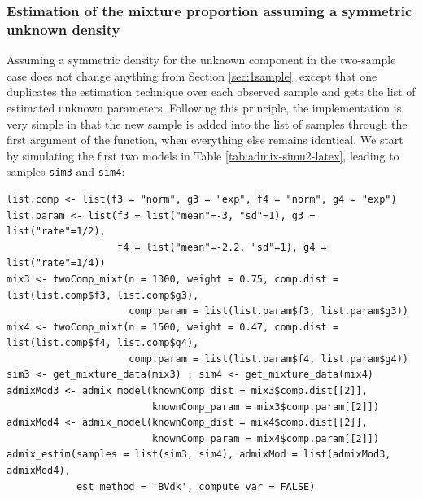 \begin{table}[!h]
\centering
\caption{\label{tab:admix-simu2-latex}Parameters in the two-sample case (K=2), with Gaussian and Exponential distributions.}
\centering
{}
\end{table}

\subsubsection{Estimation of the mixture proportion assuming a symmetric unknown density}\label{estimation-of-the-mixture-proportion-assuming-a-symmetric-unknown-density-1}

Assuming a symmetric density for the unknown component in the two-sample case does not change anything from Section \ref{sec:1sample}, except that one duplicates the estimation technique over each observed sample and gets the list of estimated unknown parameters. Following this principle, the implementation is very simple in that the new sample is added into the list of samples through the first argument of the function, when everything else remains identical.
We start by simulating the first two models in Table \ref{tab:admix-simu2-latex}, leading to samples \texttt{sim3} and \texttt{sim4}:

\begin{verbatim}
list.comp <- list(f3 = "norm", g3 = "exp", f4 = "norm", g4 = "exp")
list.param <- list(f3 = list("mean"=-3, "sd"=1), g3 = list("rate"=1/2),
                   f4 = list("mean"=-2.2, "sd"=1), g4 = list("rate"=1/4))
mix3 <- twoComp_mixt(n = 1300, weight = 0.75, comp.dist = list(list.comp$f3, list.comp$g3),
                     comp.param = list(list.param$f3, list.param$g3))
mix4 <- twoComp_mixt(n = 1500, weight = 0.47, comp.dist = list(list.comp$f4, list.comp$g4),
                     comp.param = list(list.param$f4, list.param$g4))
sim3 <- get_mixture_data(mix3) ; sim4 <- get_mixture_data(mix4)
admixMod3 <- admix_model(knownComp_dist = mix3$comp.dist[[2]],
                         knownComp_param = mix3$comp.param[[2]])
admixMod4 <- admix_model(knownComp_dist = mix4$comp.dist[[2]],
                         knownComp_param = mix4$comp.param[[2]])
admix_estim(samples = list(sim3, sim4), admixMod = list(admixMod3, admixMod4),
            est_method = 'BVdk', compute_var = FALSE)
\end{verbatim}


